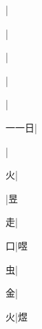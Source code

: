 \begin{multicols}{2}
{{\cjk{}{\cnsym{}　}{\cnsym{}　}{\cnsym{}　}}|{}\par
{}|{}\par
{\cjk{}{\cnsym{}　}{\cnsym{}　}{\cnsym{}　}}|{}\par
{\cjk{}{\cnsym{}　}{\cnsym{}　}{\cnsym{}　}}|{}\par
{\cjk{}{\cnsym{}　}{\cnsym{}　}{\cnsym{}　}}|{}\par
{\cjk{}一一日}|{}\par
{\cjk{}{\cnsym{}　}{\cnsym{}　}{\cnsym{}　}}|{}\par
{\cjk{}{\cnsym{}　}{\cnsym{}　}火}|{}\par
{\cjk{}{\cnsym{}　}{\cnsym{}　}{\cnsym{}　}}|{\cjk{}昱}\par
{\cjk{}{\cnsym{}　}{\cnsym{}　}走}|{}\par
{\cjk{}{\cnsym{}　}{\cnsym{}　}口}|{\cjk{}喅}\par
{\cjk{}{\cnsym{}　}{\cnsym{}　}虫}|{}\par
{\cjk{}{\cnsym{}　}{\cnsym{}　}金}|{}\par
{\cjk{}{\cnsym{}　}{\cnsym{}　}火}|{\cjk{}煜}\par
}
\end{multicols}
